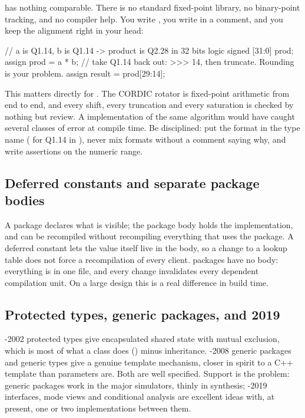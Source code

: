 \SV{} has nothing comparable. There is no standard fixed-point library, no
binary-point tracking, and no compiler help. You write
, you write  in a comment, and you
keep the alignment right in your head:

\begin{svcode}
// a is Q1.14, b is Q1.14  ->  product is Q2.28 in 32 bits
logic signed [31:0] prod;
assign prod = a * b;
// take Q1.14 back out: >>> 14, then truncate. Rounding is your problem.
assign result = prod[29:14];
\end{svcode}

This matters directly for . The CORDIC rotator is fixed-point
arithmetic from end to end, and every shift, every truncation and every
saturation is checked by nothing but review. A \VHDL{} implementation of the
same algorithm would have caught several classes of error at compile time. Be
disciplined: put the format in the type name ( for Q1.14 in
), never mix formats without a comment saying why, and write
assertions on the numeric range.

\subsection{Deferred constants and separate package bodies}

A \VHDL{} package declares what is visible; the package body holds the
implementation, and can be recompiled without recompiling everything that uses
the package. A deferred constant lets the value itself live in the body, so a
change to a lookup table does not force a recompilation of every client. \SV{}
packages have no body: everything is in one file, and every change invalidates
every dependent compilation unit. On a large design this is a real difference
in build time.

\subsection{Protected types, generic packages, and 2019}

\VHDL{}-2002 protected types give encapsulated shared state with mutual
exclusion, which is most of what a \SV{} class does () minus
inheritance.
\VHDL{}-2008 generic packages and generic types give a genuine template
mechanism, closer in spirit to a C++ template than \SV{} parameters are. Both
are well specified. Support is the problem: generic packages work in the major
simulators, thinly in synthesis; \VHDL{}-2019 interfaces, mode views and
conditional analysis are excellent ideas with, at present, one or two
implementations between them.

